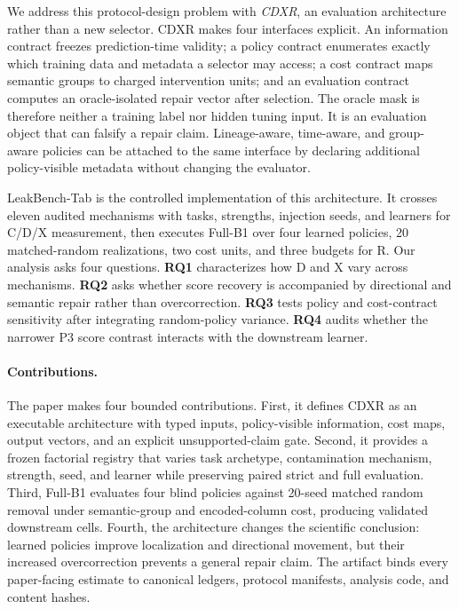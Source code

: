 \documentclass[sigconf,review]{acmart}
\begin{document}
We address this protocol-design problem with \emph{CDXR}, an evaluation
architecture rather than a new selector. CDXR makes four interfaces explicit.
An information contract freezes prediction-time validity; a policy contract
enumerates exactly which training data and metadata a selector may access; a
cost contract maps semantic groups to charged intervention units; and an
evaluation contract computes an oracle-isolated repair vector after selection.
The oracle mask is therefore neither a training label nor hidden tuning input.
It is an evaluation object that can falsify a repair claim. Lineage-aware,
time-aware, and group-aware policies can be attached to the same interface by
declaring additional policy-visible metadata without changing the evaluator.

LeakBench-Tab is the controlled implementation of this architecture. It
crosses eleven audited mechanisms with tasks, strengths, injection seeds, and
learners for C/D/X measurement, then executes Full-B1 over four learned
policies, 20 matched-random realizations, two cost units, and three budgets for
R. Our analysis asks four questions. \textbf{RQ1} characterizes how D and X
vary across mechanisms. \textbf{RQ2} asks whether score recovery is accompanied
by directional and semantic repair rather than overcorrection. \textbf{RQ3}
tests policy and cost-contract sensitivity after integrating random-policy
variance. \textbf{RQ4} audits whether the narrower P3 score contrast interacts
with the downstream learner.

\paragraph{Contributions.}
The paper makes four bounded contributions. First, it defines CDXR as an
executable architecture with typed inputs, policy-visible information,
cost maps, output vectors, and an explicit unsupported-claim gate. Second, it
provides a frozen factorial registry that varies task archetype, contamination
mechanism, strength, seed, and learner while preserving paired strict and full
evaluation. Third, Full-B1 evaluates four blind policies against 20-seed
matched random removal under semantic-group and encoded-column cost, producing
\FullBOneCellCount{} validated downstream cells. Fourth, the architecture
changes the scientific conclusion: learned policies improve localization and
directional movement, but their increased overcorrection prevents a general
repair claim. The artifact binds every paper-facing estimate to canonical
ledgers, protocol manifests, analysis code, and content hashes.
\end{document}
